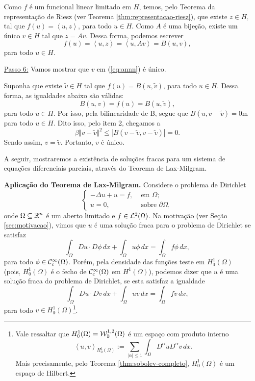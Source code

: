 \begin{prf}
    Como $f$ é um funcional linear limitado em $H$, temos, pelo Teorema da representação de Riesz (ver Teorema \ref{thm:representacao-riesz}), que existe $z \in H$, tal que $f(u) = \left\langle u, z \right\rangle$, para todo $u \in H$.
    Como $A$ é uma bijeção, existe um único $v \in H$ tal que $z = Av$. Dessa forma, podemos escrever
    \begin{equation} \label{eq:annn}
        f(u) = \left\langle u,z \right\rangle = \left\langle u, Av \right\rangle = B(u,v),
    \end{equation}
    para todo $u \in H$.

    \underline{Passo 6:} Vamos mostrar que $v$ em (\ref{eq:annn}) é único.

    Suponha que existe $\tilde v \in H$ tal que $f(u) = B(u, \tilde v)$, para todo $u \in H$.
    Dessa forma, as igualdades abaixo são válidas:
    \[
        B(u,v) = f(u) = B(u,\tilde v),
    \]
    para todo $u \in H$.
    Por isso, pela bilinearidade de B, segue que $B(u, v - \tilde v) = 0$m para todo $u \in H$.
    Dito isso, pelo item 2, chegamos a
    \[
        \beta \Vert v - \tilde v \Vert^2 \leqslant | B(v - \tilde v, v - \tilde v) | = 0.
    \]
    Sendo assim, $v = \tilde v$.
    Portanto, $v$ é único.
\end{prf}

A seguir, mostraremos a existência de soluções fracas para um sistema de equações diferenciais parciais, através do Teorema de Lax-Milgram.

\noindent\textbf{Aplicação do Teorema de Lax-Milgram}\textbf{.} Considere o problema de Dirichlet
\begin{equation} \label{eq:problema-de-dirichlet}
    \left\{
    \begin{aligned}
        -\Delta u + u = f, &\text{ em } \Omega;\\
        u = 0, &\text{ sobre } \partial\Omega,
    \end{aligned}
    \right.
\end{equation}
onde $\Omega \subseteq \mathbb{R}^n$ é um aberto limitado e $f \in \mathcal{L}^2(\Omega)$.
Na motivação (ver Seção \ref{sec:motivacao}), vimos que $u$ é uma solução fraca para o problema de Dirichlet se satisfaz
\[
    \int_\Omega Du \cdot D\phi \,dx + \int_\Omega u\phi \,dx = \int_\Omega f\phi \,dx,
\]
para todo $\phi \in \mathcal{C}^{\infty}_c(\Omega)$.
Porém, pela densidade das funções teste em $H^{1}_0(\Omega)$ (pois, $H_0^1(\Omega)$ é o fecho de $\mathcal{C}^{\infty}_c(\Omega)$ em $H^1(\Omega)$), podemos dizer que $u$ é uma solução fraca do problema de Dirichlet, se esta satisfaz a igualdade
\[
    \int_\Omega Du \cdot Dv \,dx + \int_\Omega uv \,dx = \int_\Omega fv \,dx,
\]
para todo $v \in H_0^1(\Omega)$\footnote{Vale ressaltar que $H_0^1(\Omega) = \mathcal{W}^{1,2}_0(\Omega)$ é um espaço com produto interno
\[
    \left\langle u, v \right\rangle _{H^1_0(\Omega)} := \sum_{|\alpha| \leqslant 1}\int_\Omega D^\alpha u D^\alpha v \,dx.
\]
Mais precisamente, pelo Teorema \ref{thm:sobolev-completo}, $H^1_0(\Omega)$ é um espaço de Hilbert.
}.

